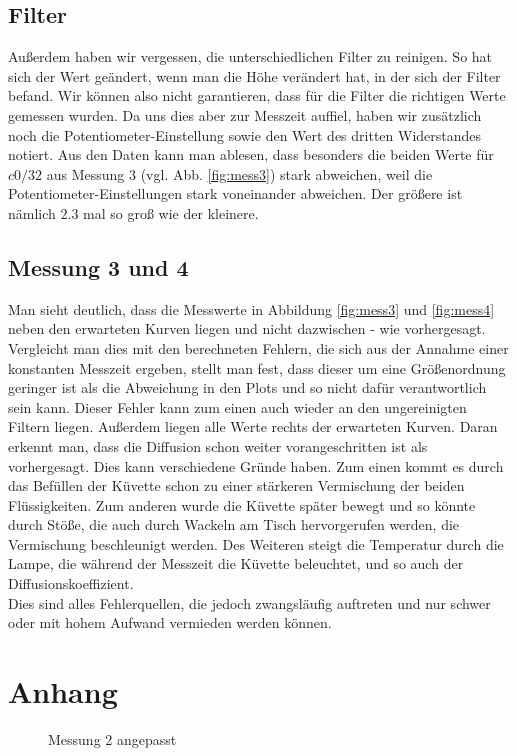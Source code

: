 \documentclass[12pt,a4paper,titlepage,headinclude,bibtotoc]{scrartcl}
\begin{document}
\subsection{Filter}
Außerdem haben wir vergessen, die unterschiedlichen Filter zu reinigen.
So hat sich der Wert geändert, wenn man die Höhe verändert hat, in der sich der Filter befand.
Wir können also nicht garantieren, dass für die Filter die richtigen Werte gemessen wurden.
Da uns dies aber zur Messzeit auffiel, haben wir zusätzlich noch die Potentiometer-Einstellung sowie den Wert des dritten Widerstandes notiert.
Aus den Daten kann man ablesen, dass besonders die beiden Werte für $c0/32$ aus Messung 3 (vgl. Abb. \ref{fig:mess3}) stark abweichen, weil die Potentiometer-Einstellungen stark voneinander abweichen. Der größere ist nämlich $2.3$ mal so groß wie der kleinere.

\subsection{Messung 3 und 4}
Man sieht deutlich, dass die Messwerte in Abbildung \ref{fig:mess3} und \ref{fig:mess4} neben den erwarteten Kurven liegen und nicht dazwischen - wie vorhergesagt.
Vergleicht man dies mit den berechneten Fehlern, die sich aus der Annahme einer konstanten Messzeit ergeben, stellt man fest, dass dieser um eine Größenordnung geringer ist als die Abweichung in den Plots und so nicht dafür verantwortlich sein kann.
Dieser Fehler kann zum einen auch wieder an den ungereinigten Filtern liegen.
Außerdem liegen alle Werte rechts der erwarteten Kurven.
Daran erkennt man, dass die Diffusion schon weiter vorangeschritten ist als vorhergesagt.
Dies kann verschiedene Gründe haben.
Zum einen kommt es durch das Befüllen der Küvette schon zu einer stärkeren Vermischung der beiden Flüssigkeiten. 
Zum anderen wurde die Küvette später bewegt und so könnte durch Stöße, die auch durch Wackeln am Tisch hervorgerufen werden, die Vermischung beschleunigt werden.
Des Weiteren steigt die Temperatur durch die Lampe, die während der Messzeit die Küvette beleuchtet, und so auch der Diffusionskoeffizient.\\

Dies sind alles Fehlerquellen, die jedoch zwangsläufig auftreten und nur schwer oder mit hohem Aufwand vermieden werden können.

\section{Anhang}
\begin{figure}[!hbt]
	\centering
	
	\caption{Messung 2 angepasst}
	\label{fig:DiffDisk}
\end{figure}
\end{document}
